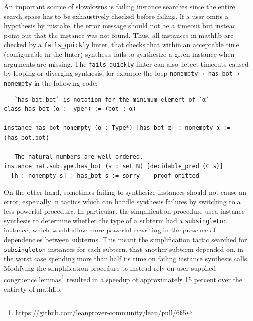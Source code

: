 \documentclass[a4paper,UKenglish,cleveref, autoref, thm-restate]{lipics-v2021}
\newcommand{\mathlib}{\textsf{mathlib}\xspace}
\begin{document}
An important source of slowdowns is failing instance searches since the entire search space has to be exhaustively checked before failing.
If a user omits a hypothesis by mistake, the error message should not be a timeout but instead point out that the instance was not found.
Thus, all instances in \mathlib are checked by a \lstinline{fails_quickly} linter,
that checks that within an acceptable time (configurable in the linter) synthesis fails to synthesize a given instance
when arguments are missing.
The \lstinline{fails_quickly} linter can also detect timeouts caused by looping or diverging synthesis,
for example the loop \lstinline{nonempty → has_bot → nonempty} in the following code:
\begin{lstlisting}
-- `has_bot.bot` is notation for the minimum element of `α`
class has_bot (α : Type*) := (bot : α)

instance has_bot_nonempty (α : Type*) [has_bot α] : nonempty α :=
⟨has_bot.bot⟩

-- The natural numbers are well-ordered.
instance nat.subtype.has_bot (s : set ℕ) [decidable_pred (∈ s)]
  [h : nonempty s] : has_bot s := sorry -- proof omitted
\end{lstlisting}

On the other hand, sometimes failing to synthesize instances should not cause an error,
especially in tactics which can handle synthesis failures by switching to a less powerful procedure.
In particular, the simplification procedure used instance synthesis to determine whether the type of a subterm had a \lstinline{subsingleton} instance,
which would allow more powerful rewriting in the presence of dependencies between subterms.
This meant the simplification tactic searched for \lstinline{subsingleton} instances for each subterm that another subterm depended on,
in the worst case spending more than half its time on failing instance synthesis calls.
Modifying the simplification procedure to instead rely on user-supplied congruence lemmas\footnote{\url{https://github.com/leanprover-community/lean/pull/665}}
resulted in a speedup of approximately 15 percent over the entirety of \mathlib.
\end{document}

